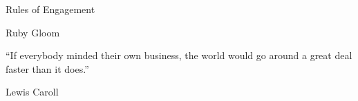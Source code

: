 \begin{BookTitle}
Rules of Engagement
\end{BookTitle}
\begin{Author}
Ruby Gloom
\end{Author}
\begin{Epigraph}
``If everybody minded their own business, the world would go around a great deal faster than it does.''
\end{Epigraph}
\begin{EpigraphSource}
\textemdash{}Lewis Caroll
\end{EpigraphSource}
